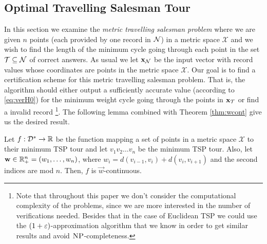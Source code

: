 \subsection{Optimal Travelling Salesman Tour} \label{ssec:tspIOpt}

In this section we examine the \textit{metric travelling salesman problem} where we are given $n$ points (each provided by one record in $\mathcal{N}$) in a metric space
$\mathcal{X}$ and we wish to find the length of the minimum cycle going through each point in the set $\mathcal{T}\subseteq \mathcal{N}$ of correct answers. As usual we let
$\mathbf{x}_{\mathcal{N}}$ be the input vector with record values whose coordinates are points in the metric space $\mathcal{X}$. Our goal is to find a certification
scheme for this metric travelling salesman problem. That is, the algorithm should either output a sufficiently accurate value (according to \ref{eq:verH0}) for the
minimum weight cycle going through the points in $\mathbf{x}_{\mathcal{T}}$  or find a invalid record \footnote{Note that throughout this paper we don't consider the
computational complexity of the problems, since we are more interested in the number of verifications needed. Besides that in the case of Euclidean TSP we could
use the $(1 + \varepsilon)$-approximation algorithm that we know in order to get similar results and avoid $\textsc{NP}$-completeness.}. The following lemma combined with Theorem \ref{thm:wcont} give us
the desired result.

\begin{lemma}\label{lm:tsp}
    Let $f : \mathcal{D}^* \to \mathbb{R}$ be the function mapping a set of points in a metric space $\mathcal{X}$ to their minimum TSP tour and let $v_1v_2\dots v_n$ be the
  minimum TSP tour. Also, let $\mathbf{w} \in \mathbb{R}_+^n=(w_1,\dots,w_n)$, where
  $w_i=d(v_{i-1},v_i)+d(v_i,v_{i+1})$ and the second indices are mod $n$. Then, $f$ is $\vec{w}$-continuous.
\end{lemma}

